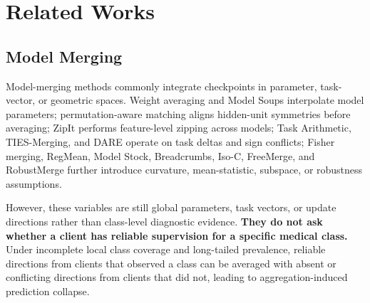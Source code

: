 \documentclass[letterpaper]{article} %
\begin{document}
\section{Related Works}

\subsection{Model Merging}

Model-merging methods commonly integrate checkpoints in parameter, task-vector, or geometric spaces. Weight averaging and Model Soups interpolate model parameters\cite{izmailov2018averaging,pmlr-v162-wortsman22a}; permutation-aware matching aligns hidden-unit symmetries before averaging\cite{entezari2022role,ainsworth2023gitrebasinmergingmodels}; ZipIt performs feature-level zipping across models\cite{stoica2024zipit}; Task Arithmetic, TIES-Merging, and DARE operate on task deltas and sign conflicts\cite{ilharco2023editingmodelstaskarithmetic,yadav2023tiesmergingresolvinginterferencemerging,yu2024languagemodelssupermario}; Fisher merging, RegMean, Model Stock, Breadcrumbs, Iso-C, FreeMerge, and RobustMerge further introduce curvature, mean-statistic, subspace, or robustness assumptions\cite{matena2022mergingmodelsfisherweightedaveraging,jin2025datalessknowledgefusionmerging,jang2025modelstockneedjust,davari2024modelbreadcrumbsscalingmultitask,marczak2025taskleftbehindisotropic,zheng2025freemergingfouriertransformefficient,zeng2025robustmergeparameterefficientmodelmerging}.

However, these variables are still global parameters, task vectors, or update directions rather than class-level diagnostic evidence. \textbf{They do not ask whether a client has reliable supervision for a specific medical class.} Under incomplete local class coverage and long-tailed prevalence, reliable directions from clients that observed a class can be averaged with absent or conflicting directions from clients that did not, leading to aggregation-induced prediction collapse\cite{BUDA2018249,10.1371/journal.pmed.1002683}.
\end{document}
